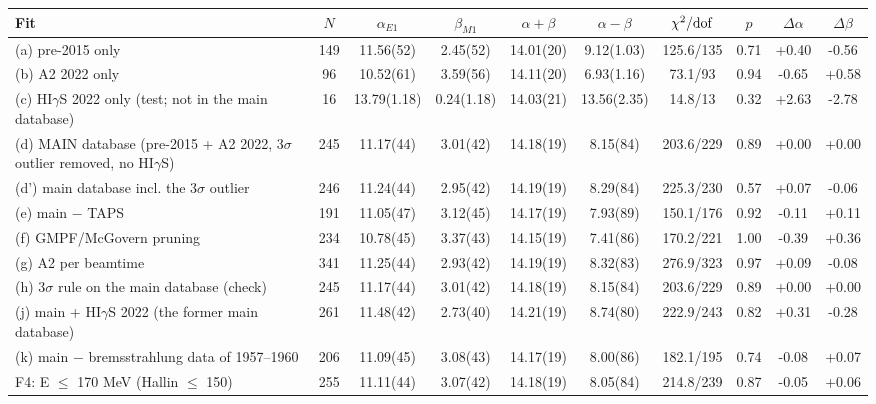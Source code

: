 \begin{tabular}{lccccccccc}
\hline
Fit & $N$ & $\alpha_{E1}$ & $\beta_{M1}$ & $\alpha+\beta$ & $\alpha-\beta$ & $\chi^2/{\rm dof}$ & $p$ & $\Delta\alpha$ & $\Delta\beta$ \\
\hline
(a) pre-2015 only & 149 & 11.56(52) & 2.45(52) & 14.01(20) & 9.12(1.03) & 125.6/135 & 0.71 & +0.40 & -0.56 \\
(b) A2 2022 only & 96 & 10.52(61) & 3.59(56) & 14.11(20) & 6.93(1.16) & 73.1/93 & 0.94 & -0.65 & +0.58 \\
(c) HI$\gamma$S 2022 only (test; not in the main database) & 16 & 13.79(1.18) & 0.24(1.18) & 14.03(21) & 13.56(2.35) & 14.8/13 & 0.32 & +2.63 & -2.78 \\
(d) MAIN database (pre-2015 + A2 2022, 3$\sigma$ outlier removed, no HI$\gamma$S) & 245 & 11.17(44) & 3.01(42) & 14.18(19) & 8.15(84) & 203.6/229 & 0.89 & +0.00 & +0.00 \\
(d') main database incl. the 3$\sigma$ outlier & 246 & 11.24(44) & 2.95(42) & 14.19(19) & 8.29(84) & 225.3/230 & 0.57 & +0.07 & -0.06 \\
(e) main $-$ TAPS & 191 & 11.05(47) & 3.12(45) & 14.17(19) & 7.93(89) & 150.1/176 & 0.92 & -0.11 & +0.11 \\
(f) GMPF/McGovern pruning & 234 & 10.78(45) & 3.37(43) & 14.15(19) & 7.41(86) & 170.2/221 & 1.00 & -0.39 & +0.36 \\
(g) A2 per beamtime & 341 & 11.25(44) & 2.93(42) & 14.19(19) & 8.32(83) & 276.9/323 & 0.97 & +0.09 & -0.08 \\
(h) 3$\sigma$ rule on the main database (check) & 245 & 11.17(44) & 3.01(42) & 14.18(19) & 8.15(84) & 203.6/229 & 0.89 & +0.00 & +0.00 \\
(j) main + HI$\gamma$S 2022 (the former main database) & 261 & 11.48(42) & 2.73(40) & 14.21(19) & 8.74(80) & 222.9/243 & 0.82 & +0.31 & -0.28 \\
(k) main $-$ bremsstrahlung data of 1957–1960 & 206 & 11.09(45) & 3.08(43) & 14.17(19) & 8.00(86) & 182.1/195 & 0.74 & -0.08 & +0.07 \\
F4: E $\le$ 170 MeV (Hallin $\le$ 150) & 255 & 11.11(44) & 3.07(42) & 14.18(19) & 8.05(84) & 214.8/239 & 0.87 & -0.05 & +0.06 \\
\hline
\end{tabular}

